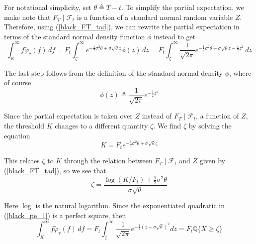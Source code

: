 \documentclass{article}
\numberwithin{equation}{section}
\begin{document}
For notational simplicity, set $ \theta \triangleq T - t $. To simplify the
partial expectation, we make note that $ F_T \mid \mathcal{F}_t $ is a function
of a standard normal random variable $ Z $. Therefore, using
(\ref{black_FT_tad}), we can rewrite the partial expectation in terms of the
standard normal density function $ \phi $ instead to get
\begin{equation} \label{black_pe_1}
    \int_K^\infty f\widetilde{\varphi}_\tau(f)\,df =
    F_t\int_\zeta^\infty e^{-\frac{1}{2}\sigma^2\theta +
    \sigma\sqrt{\theta}z}\phi(z)\,dz =
    F_t\int_\zeta^\infty\frac{1}{\sqrt{2\pi}}e^{-\frac{1}{2}\sigma^2\theta +
    \sigma\sqrt{\theta}z - \frac{1}{2}z^2}\,dz
\end{equation}

The last step follows from the definition of the standard normal density
$ \phi $, where of course
\begin{equation*}
    \phi(z) \triangleq \frac{1}{\sqrt{2\pi}}e^{-\frac{1}{2}z^2}
\end{equation*}

Since the partial expectation is taken over $ Z $ instead of
$ F_T \mid \mathcal{F}_t $, a function of $ Z $, the threshold $ K $ changes to
a different quantity $ \zeta $. We find $ \zeta $ by solving the equation
\begin{equation*}
    K = F_te^{-\frac{1}{2}\sigma^2\theta + \sigma\sqrt{\theta}\zeta}
\end{equation*}

This relates $ \zeta $ to $ K $ through the relation between
$ F_T \mid \mathcal{F}_t $ and $ Z $ given by (\ref{black_FT_tad}), so we see
that
\begin{equation} \label{black_zeta}
    \zeta = \frac{
        \log(K / F_t) + \frac{1}{2}\sigma^2\theta
    }{\sigma\sqrt{\theta}}
\end{equation}

Here $ \log $ is the natural logarithm. Since the exponentiated quadratic in
(\ref{black_pe_1}) is a perfect square, then
\begin{equation*}
    \int_K^\infty f\widetilde{\varphi}_\tau(f)\,df =
    F_t\int_\zeta^\infty\frac{1}{\sqrt{2\pi}}
    e^{-\frac{1}{2}(z - \sigma\sqrt{\theta})^2}dz = 
    F_t\mathbb{Q}\{X \ge \zeta\}
\end{equation*}
\end{document}

